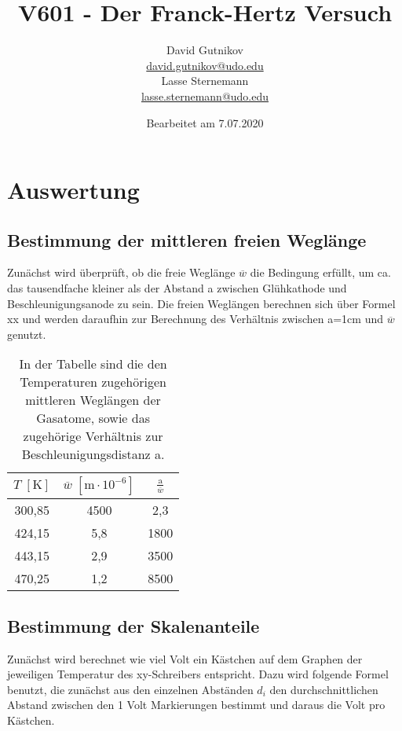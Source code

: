 \documentclass[titlepage = firstcover]{scrartcl}
\title{V601 - Der Franck-Hertz Versuch}
\author{
  David Gutnikov\\
  \href{mailto:david.gutnikov@udo.edu}{david.gutnikov@udo.edu}\\
  Lasse Sternemann\\
  \href{mailto:lasse.sternemann@udo.edu}{lasse.sternemann@udo.edu}
}
\date{Bearbeitet am 7.07.2020}
\begin{document}
    \maketitle
    \newpage
    \tableofcontents
    \newpage

    \section{Auswertung}    
        \subsection{Bestimmung der mittleren freien Weglänge}
            Zunächst wird überprüft, ob die freie Weglänge $\overline{w}$ die Bedingung erfüllt, um ca. das tausendfache kleiner als der Abstand a zwischen Glühkathode und Beschleunigungsanode zu sein.
            Die freien Weglängen berechnen sich über Formel xx und werden daraufhin zur Berechnung des Verhältnis zwischen a=1cm und $\overline{w}$ genutzt.

            \begin{table}[h]
                \centering
                \caption{In der Tabelle sind die den Temperaturen zugehörigen mittleren Weglängen der Gasatome, sowie das zugehörige Verhältnis zur Beschleunigungsdistanz a.}
                \label{tab:TabGasdruck}

                \begin{tabular}{c  c c}
                    \toprule
                    {$T \; [\text{K}] $} & {$\overline{w} \; [\text{m}\cdot 10^{-6}]$} &  {$\frac{\text{a}}{\overline{w}}$} \\
                    \midrule
                    300,85 & 4500 & 2,3 \\
                    424,15 & 5,8 &  1800  \\
                    443,15 & 2,9 &  3500  \\
                    470,25 & 1,2 &  8500  \\
                    \bottomrule
                \end{tabular}

            \end{table}
        
        \subsection{Bestimmung der Skalenanteile}
            Zunächst wird berechnet wie viel Volt ein Kästchen auf dem Graphen der jeweiligen Temperatur des xy-Schreibers entspricht. Dazu wird folgende Formel benutzt, die zunächst aus den 
            einzelnen Abständen $d_i$ den durchschnittlichen Abstand zwischen den 1 Volt Markierungen bestimmt und daraus die Volt pro Kästchen.
\end{document}
